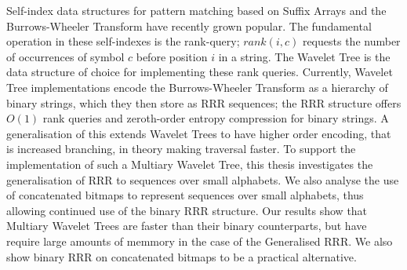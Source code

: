 Self-index data structures for pattern matching based on Suffix
Arrays and the \\ Burrows-Wheeler Transform have recently grown
popular.
The fundamental operation in these self-indexes is the rank-query; $rank(i, c)$ 
requests the 
number of occurrences of symbol $c$ before position $i$ in a string. The Wavelet 
Tree is the data structure of choice for implementing these rank queries. 
Currently, Wavelet Tree implementations encode the Burrows-Wheeler Transform as 
a hierarchy of binary strings, which they then store as RRR sequences;
the RRR structure offers $O(1)$ rank queries and zeroth-order entropy compression for 
binary strings. A generalisation of this extends Wavelet Trees to have higher 
order encoding, that is increased branching, in theory making traversal faster. 
To support the implementation of such a Multiary
Wavelet Tree, this thesis investigates the generalisation of RRR to sequences 
over small alphabets. We also analyse the use of concatenated bitmaps to 
represent sequences over small alphabets, thus allowing continued use of the
binary RRR structure. Our results show that Multiary Wavelet Trees are faster
than their binary counterparts, but have require large amounts of memmory in the 
case of the Generalised RRR. We also show binary RRR on concatenated bitmaps to 
be a practical alternative.